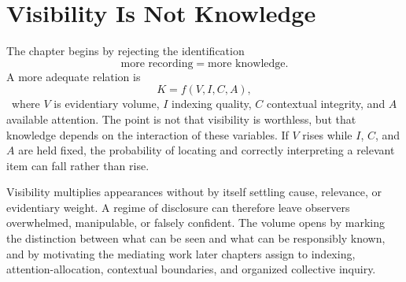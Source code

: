 
\chapter{Visibility Is Not Knowledge}
\label{ch:ch023}

The chapter begins by rejecting the identification
\[
\text{more recording}=\text{more knowledge}.
\]
A more adequate relation is
\[
K = f(V,I,C,A),
\]
\ToyModel\ where \(V\) is evidentiary volume, \(I\) indexing quality, \(C\) contextual integrity, and \(A\) available attention. The point is not that visibility is worthless, but that knowledge depends on the interaction of these variables. If \(V\) rises while \(I\), \(C\), and \(A\) are held fixed, the probability of locating and correctly interpreting a relevant item can fall rather than rise.

Visibility multiplies appearances without by itself settling cause, relevance, or evidentiary weight. A regime of disclosure can therefore leave observers overwhelmed, manipulable, or falsely confident. The volume opens by marking the distinction between what can be seen and what can be responsibly known, and by motivating the mediating work later chapters assign to indexing, attention-allocation, contextual boundaries, and organized collective inquiry.
